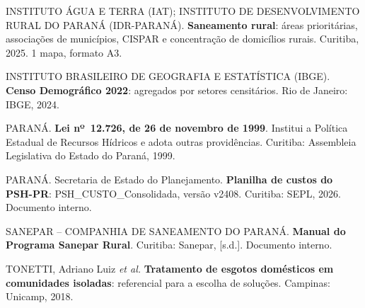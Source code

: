 \begin{SingleSpacing}
\noindent INSTITUTO ÁGUA E TERRA (IAT); INSTITUTO DE DESENVOLVIMENTO RURAL DO PARANÁ (IDR-PARANÁ). \textbf{Saneamento rural}: áreas prioritárias, associações de municípios, CISPAR e concentração de domicílios rurais. Curitiba, 2025. 1 mapa, formato A3.\par\medskip
\noindent INSTITUTO BRASILEIRO DE GEOGRAFIA E ESTATÍSTICA (IBGE). \textbf{Censo Demográfico 2022}: agregados por setores censitários. Rio de Janeiro: IBGE, 2024.\par\medskip
\noindent PARANÁ. \textbf{Lei nº~12.726, de 26 de novembro de 1999}. Institui a Política Estadual de Recursos Hídricos e adota outras providências. Curitiba: Assembleia Legislativa do Estado do Paraná, 1999.\par\medskip
\noindent PARANÁ. Secretaria de Estado do Planejamento. \textbf{Planilha de custos do PSH-PR}: PSH\_CUSTO\_Consolidada, versão v2408. Curitiba: SEPL, 2026. Documento interno.\par\medskip
\noindent SANEPAR – COMPANHIA DE SANEAMENTO DO PARANÁ. \textbf{Manual do Programa Sanepar Rural}. Curitiba: Sanepar, [s.d.]. Documento interno.\par\medskip
\noindent TONETTI, Adriano Luiz \textit{et al.} \textbf{Tratamento de esgotos domésticos em comunidades isoladas}: referencial para a escolha de soluções. Campinas: Unicamp, 2018.\par\medskip
\end{SingleSpacing}
